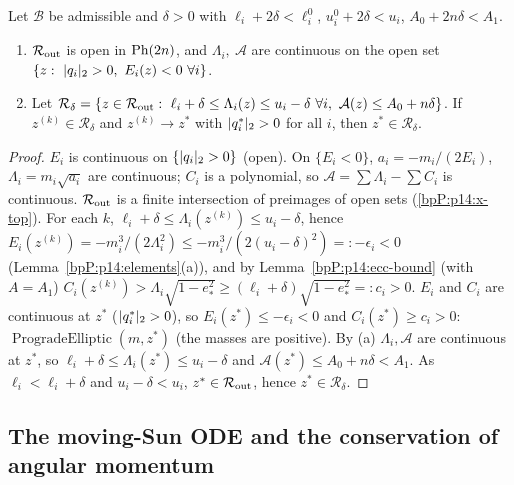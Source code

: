 \begin{lemma}\label{bpP:p14:closure}
Let $\mathcal B$ be admissible and $\delta>0$ with $\ell_i+2\delta<\ell^0_i$, $u^0_i+2\delta<u_i$, $A_0+2n\delta<A_1$.
\begin{enumerate}[label=(\alph*)]
\item $\mathcal R_{\rm out}$ is open in $\mathrm{Ph}(2n)$, and $\Lambda_i,\ \mathcal A$ are continuous on the open set $\{z:\ \pl{q_i}>0,\ E_i(z)<0\ \forall i\}$.
\item Let $\mathcal R_\delta=\{z\in\mathcal R_{\rm out}:\ \ell_i+\delta\le\Lambda_i(z)\le u_i-\delta\ \forall i,\ \mathcal A(z)\le A_0+n\delta\}$. If $z^{(k)}\in\mathcal R_\delta$ and $z^{(k)}\to z^*$ with $\lvert q^*_i\rvert_2>0$ for all $i$, then $z^*\in\mathcal R_\delta$.
\end{enumerate}
\end{lemma}
\begin{proof}
\label{stepP:p14:cl-a} $E_i$ is continuous on $\{\lvert q_i\rvert_2>0\}$ (open). On $\{E_i<0\}$, $a_i=-m_i/(2E_i)$, $\Lambda_i=m_i\sqrt{a_i}$ are continuous; $C_i$ is a polynomial, so $\mathcal A=\sum\Lambda_i-\sum C_i$ is continuous. $\mathcal R_{\rm out}$ is a finite intersection of preimages of open sets (\ref{bpP:p14:x-top}).
\label{stepP:p14:cl-b} For each $k$, $\ell_i+\delta\le\Lambda_i(z^{(k)})\le u_i-\delta$, hence $E_i(z^{(k)})=-m_i^3/(2\Lambda_i^2)\le-m_i^3/(2(u_i-\delta)^2)=:-\epsilon_i<0$ (Lemma~\ref{bpP:p14:elements}(a)), and by Lemma~\ref{bpP:p14:ecc-bound} (with $A=A_1$) $C_i(z^{(k)})>\Lambda_i\sqrt{1-e_*^2}\ge(\ell_i+\delta)\sqrt{1-e_*^2}=:c_i>0$. 
\label{stepP:p14:cl-c} $E_i$ and $C_i$ are continuous at $z^*$ ($\lvert q^*_i\rvert_2>0$), so $E_i(z^*)\le-\epsilon_i<0$ and $C_i(z^*)\ge c_i>0$: $\operatorname{ProgradeElliptic}(m,z^*)$ (the masses are positive). By (a) $\Lambda_i,\mathcal A$ are continuous at $z^*$, so $\ell_i+\delta\le\Lambda_i(z^*)\le u_i-\delta$ and $\mathcal A(z^*)\le A_0+n\delta<A_1$. As $\ell_i<\ell_i+\delta$ and $u_i-\delta<u_i$, $z^*\in\mathcal R_{\rm out}$, hence $z^*\in\mathcal R_\delta$.
\end{proof}

\subsection{The moving-Sun ODE and the conservation of angular momentum}\label{bpP:p14:sec-ode}

